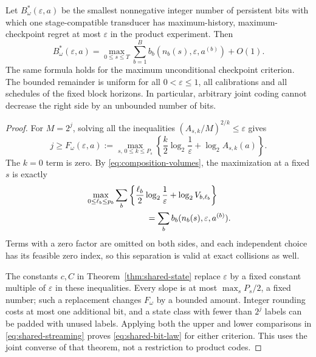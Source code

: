\begin{theorem}\label{thm:shared-bits}
Let $B_\omega^*(\varepsilon,a)$ be the smallest nonnegative integer
number of persistent bits with which one stage-compatible transducer
has maximum-history, maximum-checkpoint regret at most $\varepsilon$
in the product experiment. Then
\begin{equation}\label{eq:shared-bit-law}
 B_\omega^*(\varepsilon,a)=
     \max_{0\le s\le T}\sum_{b=1}^B
       b_b(n_b(s),\varepsilon,a^{(b)})+O(1).
\end{equation}
The same formula holds for the maximum unconditional checkpoint
criterion. The bounded remainder is uniform for all
$0<\varepsilon\le1$, all calibrations and all schedules of the fixed
block horizons. In particular, arbitrary joint coding cannot decrease
the right side by an unbounded number of bits.
\end{theorem}
\begin{proof}
For $M=2^j$, solving all the inequalities
$(A_{s,k}/M)^{2/k}\le\varepsilon$ gives
\[
 j\ge
 F_\omega(\varepsilon,a):=
 \max_{s,\,0\le k\le P_s}
       \left\{\frac{k}{2}\log_2\frac1\varepsilon
                            +\log_2 A_{s,k}(a)\right\}.
\]
The $k=0$ term is zero. By \eqref{eq:composition-volumes}, the
maximization at a fixed $s$ is exactly
\[
 \begin{split}
 &\max_{0\le\ell_b\le p_b}
       \sum_b\left\{\frac{\ell_b}{2}\log_2\frac1\varepsilon
                                        +\log_2V_{b,\ell_b}\right\}\\
 &\hspace{25mm}=\sum_b b_b(n_b(s),\varepsilon,a^{(b)}).
 \end{split}
\]
Terms with a zero factor are omitted on both sides, and each independent
choice has its feasible zero index, so this separation is valid at exact
collisions as well.

The constants $c,C$ in Theorem~\ref{thm:shared-state} replace
$\varepsilon$ by a fixed constant multiple of $\varepsilon$ in these
inequalities. Every slope is at most $\max_sP_s/2$, a fixed number;
such a replacement changes $F_\omega$ by a bounded amount. Integer
rounding costs at most one additional bit, and a state class with fewer
than $2^j$ labels can be padded with unused labels. Applying both the
upper and lower comparisons in \eqref{eq:shared-streaming} proves
\eqref{eq:shared-bit-law} for either criterion. This uses the joint
converse of that theorem, not a restriction to product codes.
\end{proof}

